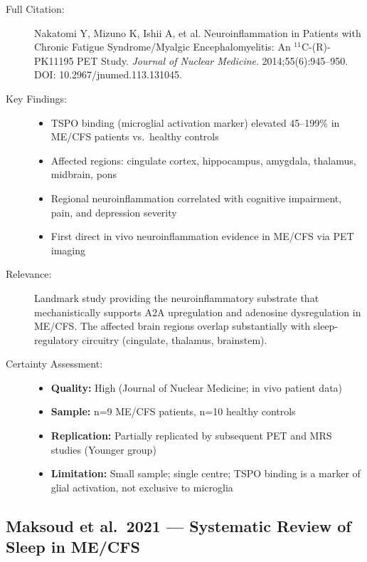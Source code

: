 \begin{description}
    \item[Full Citation:] Nakatomi Y, Mizuno K, Ishii A, et al. Neuroinflammation in Patients with Chronic Fatigue Syndrome/Myalgic Encephalomyelitis: An $^{11}$C-(R)-PK11195 PET Study. \textit{Journal of Nuclear Medicine}. 2014;55(6):945--950. DOI: 10.2967/jnumed.113.131045.
    \item[Key Findings:]
    \begin{itemize}
        \item TSPO binding (microglial activation marker) elevated 45--199\% in ME/CFS patients vs.\ healthy controls
        \item Affected regions: cingulate cortex, hippocampus, amygdala, thalamus, midbrain, pons
        \item Regional neuroinflammation correlated with cognitive impairment, pain, and depression severity
        \item First direct in vivo neuroinflammation evidence in ME/CFS via PET imaging
    \end{itemize}
    \item[Relevance:] Landmark study providing the neuroinflammatory substrate that mechanistically supports A2A upregulation and adenosine dysregulation in ME/CFS. The affected brain regions overlap substantially with sleep-regulatory circuitry (cingulate, thalamus, brainstem).
    \item[Certainty Assessment:]
    \begin{itemize}
        \item \textbf{Quality:} High (Journal of Nuclear Medicine; in vivo patient data)
        \item \textbf{Sample:} n=9 ME/CFS patients, n=10 healthy controls
        \item \textbf{Replication:} Partially replicated by subsequent PET and MRS studies (Younger group)
        \item \textbf{Limitation:} Small sample; single centre; TSPO binding is a marker of glial activation, not exclusive to microglia
    \end{itemize}
\end{description}

\subsection{Maksoud et al.\ 2021 --- Systematic Review of Sleep in ME/CFS}

